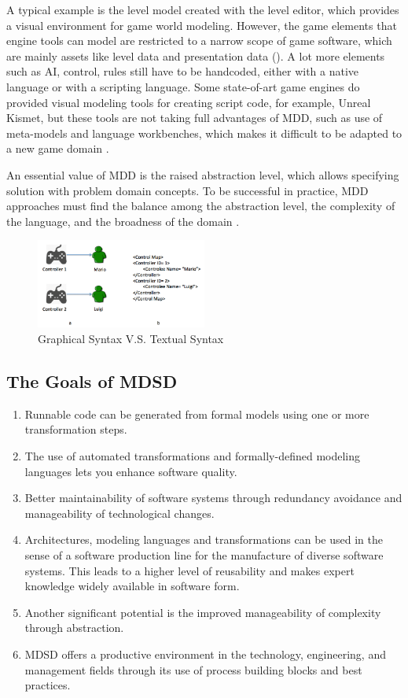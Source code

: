 A typical example is the level model created with the level editor, which provides a visual environment for game world modeling. However, the game elements that engine tools can model are restricted to a narrow scope of game software, which are mainly assets like level data and presentation data (). A lot more elements such as AI, control, rules still have to be handcoded, either with a native language or with a scripting language. Some state-of-art game engines do provided visual modeling tools for creating script code, for example, Unreal Kismet, but these tools are not taking full advantages of MDD, such as use of meta-models and language workbenches, which makes it difficult to be adapted to a new game domain \citep{model-zhu-2014}.

An essential value of MDD is the raised abstraction level, which allows specifying solution with problem domain concepts. To be successful in practice, MDD approaches must find the balance among the abstraction level, the complexity of the language, and the broadness of the domain \citep{model-stahl-2006}.

\begin{figure}[!htbp]
\includegraphics[width=0.5\textwidth]{img/Language-concept.PNG}
\caption{ Graphical Syntax V.S. Textual Syntax }
\label{fig:lang-concept}
\end{figure}

\pagebreak
\subsection{The Goals of MDSD}

\begin{enumerate}
\item Runnable code can be generated from formal models using one or more transformation steps.
\item The use of automated transformations and formally-defined modeling languages lets you enhance software quality.
\item Better maintainability of software systems through redundancy avoidance and manageability of technological changes.
\item Architectures, modeling languages and transformations can be used in the sense of a software production line for the manufacture of diverse software systems. This leads to a higher level of reusability and makes expert knowledge widely available in software form.
\item Another significant potential is the improved manageability of complexity through abstraction.
\item MDSD offers a productive environment in the technology, engineering, and management fields through its use of process building blocks and best practices.
\end{enumerate}

